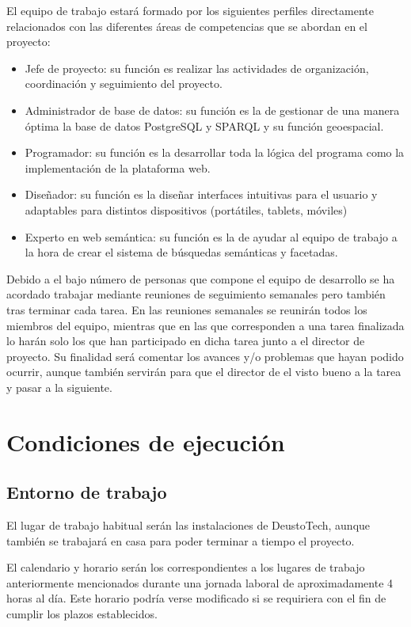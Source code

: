 El equipo de trabajo estará formado por los siguientes perfiles directamente relacionados con las diferentes áreas de competencias que se abordan en el proyecto: 

\begin{itemize}
	\item Jefe de proyecto: su función es realizar las actividades de organización, coordinación y seguimiento del proyecto.
	\item Administrador de base de datos: su función es la de gestionar de una manera óptima la base de datos PostgreSQL y SPARQL y su función geoespacial. 
	\item Programador: su función es la desarrollar toda la lógica del programa como la implementación de la plataforma web. 
	\item Diseñador: su función es la diseñar interfaces intuitivas para el usuario y adaptables para distintos dispositivos (portátiles, tablets, móviles) 
	\item Experto en web semántica: su función es la de ayudar al equipo de trabajo a la hora de crear el sistema de búsquedas semánticas y facetadas. 
\end{itemize}

Debido a el bajo número de personas que compone el equipo de desarrollo se ha acordado trabajar mediante reuniones de seguimiento semanales pero también tras terminar cada tarea. En las reuniones semanales se reunirán todos los miembros del equipo, mientras que en las que corresponden a una tarea finalizada lo harán solo los que han participado en dicha tarea junto a el director de proyecto. Su finalidad será comentar los avances y/o problemas que hayan podido ocurrir, aunque también servirán para que el director de el visto bueno a la tarea y pasar a la siguiente. 

\chapter{Condiciones de ejecución}

\section{Entorno de trabajo}

El lugar de trabajo habitual serán las instalaciones de DeustoTech, aunque también se trabajará en casa para poder terminar a tiempo el proyecto.

El calendario y horario serán los correspondientes a los lugares de trabajo anteriormente mencionados durante una jornada laboral de aproximadamente 4 horas al día. Este horario podría verse modificado si se requiriera con el fin de cumplir los plazos establecidos.


